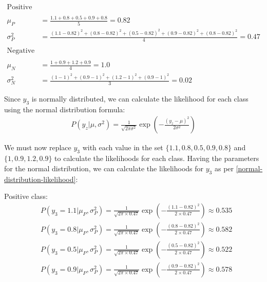 \documentclass[12pt]{article}
\begin{document}
\begin{enumerate}[leftmargin=\labelsep]
    \vspace{10pt}
{
\begin{equation*}
    \begin{array}{ll}
        \text{Positive class:} & \\
        \\
        \mu_P &= \frac{1.1 + 0.8 + 0.5 + 0.9 + 0.8}{5} = 0.82 \\[10pt]
        \sigma_P^2 &= \frac{(1.1 - 0.82)^2 + (0.8 - 0.82)^2 + (0.5 - 0.82)^2 + (0.9 - 0.82)^2 + (0.8 - 0.82)^2}{4} = 0.47 \\
        \\
        \text{Negative class:} & \\
        \\
        \mu_N &= \frac{1 + 0.9 + 1.2 + 0.9}{4} = 1.0 \\[10pt]
        \sigma_N^2 &= \frac{(1 - 1)^2 + (0.9 - 1)^2 + (1.2 - 1)^2 + (0.9 - 1)^2}{3} = 0.02
    \end{array}
\end{equation*}
}

\vspace{10pt}
    Since $y_3$ is normally distributed, we can calculate the likelihood for each class using the normal distribution formula:
    \begin{equation}\label{normal-distribution-likelihood}
        \begin{aligned}
            P(y_z|\mu, \sigma^2) = \frac{1}{\sqrt{2\pi \sigma^2}} \exp\left(-\frac{(y_z - \mu)^2}{2\sigma^2}\right)
        \end{aligned}
    \end{equation}

    \vspace{10pt}
    We must now replace $y_3$ with each value in the set $\{1.1, 0.8, 0.5, 0.9, 0.8\}$ and $\{1, 0.9, 1.2, 0.9\}$ 
    to calculate the likelihoods for each class.
    Having the parameters for the normal distribution, we can calculate the likelihoods for $y_3$ as per \eqref{normal-distribution-likelihood}:
    
    \vspace{10pt}
    Positive class:
    \begin{equation*}
        \begin{aligned}
            &P(y_3 = 1.1|\mu_P, \sigma_P^2) = \frac{1}{\sqrt{2\pi \times 0.47}} \exp\left(-\frac{(1.1 - 0.82)^2}{2 \times 0.47}\right) \approx 0.535\\
            &P(y_3 = 0.8|\mu_P, \sigma_P^2) = \frac{1}{\sqrt{2\pi \times 0.47}} \exp\left(-\frac{(0.8 - 0.82)^2}{2 \times 0.47}\right) \approx 0.582\\
            &P(y_3 = 0.5|\mu_P, \sigma_P^2) = \frac{1}{\sqrt{2\pi \times 0.47}} \exp\left(-\frac{(0.5 - 0.82)^2}{2 \times 0.47}\right) \approx 0.522\\
            &P(y_3 = 0.9|\mu_P, \sigma_P^2) = \frac{1}{\sqrt{2\pi \times 0.47}} \exp\left(-\frac{(0.9 - 0.82)^2}{2 \times 0.47}\right) \approx 0.578
        \end{aligned}
    \end{equation*}



\end{enumerate}
\end{document}
